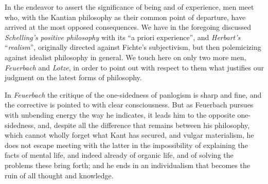In the endeavor to assert the significance of being and of experience,
men meet who, with the Kantian philosophy as their common point of
departure, have arrived at the most opposed consequences. We have in
the foregoing discussed \emph{Schelling's} \emph{positive philosophy}
with its ``a priori experience'', and \emph{Herbart's}
``\emph{realism}'', originally directed against Fichte's subjectivism,
but then polemicizing against idealist philosophy in general. We touch
here on only two more men, \emph{Feuerbach} and \emph{Lotze}, in order
to point out with respect to them what justifies our judgment on the
latest forms of philosophy.

In \emph{Feuerbach} the critique of the one-sidedness of panlogism is
sharp and fine, and the corrective is pointed to with clear
consciousness. But as Feuerbach pursues with unbending energy the way he
indicates, it leads him to the opposite one-sidedness, and, despite all
the difference that remains between his philosophy, which cannot wholly
forget what Kant has secured, and vulgar materialism, he does not
escape meeting with the latter in the impossibility of
explaining the facts of mental life, and indeed already of organic
life, and of solving the problems these bring forth; and he ends in an
individualism that becomes the ruin of all thought and knowledge.


